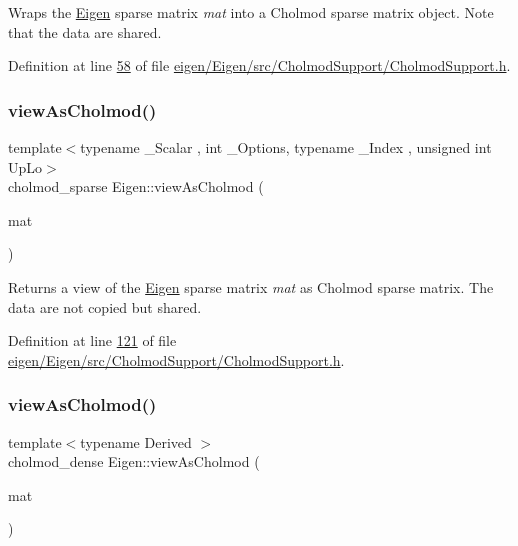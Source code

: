 Wraps the \hyperlink{namespace_eigen}{Eigen} sparse matrix {\itshape mat} into a Cholmod sparse matrix object. Note that the data are shared. 

Definition at line \hyperlink{eigen_2_eigen_2src_2_cholmod_support_2_cholmod_support_8h_source_l00058}{58} of file \hyperlink{eigen_2_eigen_2src_2_cholmod_support_2_cholmod_support_8h_source}{eigen/\+Eigen/src/\+Cholmod\+Support/\+Cholmod\+Support.\+h}.

\mbox{\label{namespace_eigen_afacb818b18280e2e1ab73836ab74cab5}} 
\subsubsection{\texorpdfstring{view\+As\+Cholmod()}{viewAsCholmod()}\hspace{0.1cm}{\footnotesize\ttfamily [2/3]}}
{\footnotesize\ttfamily template$<$typename \+\_\+\+Scalar , int \+\_\+\+Options, typename \+\_\+\+Index , unsigned int Up\+Lo$>$ \\
cholmod\+\_\+sparse Eigen\+::view\+As\+Cholmod (\begin{DoxyParamCaption}\item[{const \hyperlink{group___sparse_core___module_class_eigen_1_1_sparse_self_adjoint_view}{Sparse\+Self\+Adjoint\+View}$<$ const \hyperlink{group___sparse_core___module_class_eigen_1_1_sparse_matrix}{Sparse\+Matrix}$<$ \+\_\+\+Scalar, \+\_\+\+Options, \+\_\+\+Index $>$, Up\+Lo $>$ \&}]{mat }\end{DoxyParamCaption})}

Returns a view of the \hyperlink{namespace_eigen}{Eigen} sparse matrix {\itshape mat} as Cholmod sparse matrix. The data are not copied but shared. 

Definition at line \hyperlink{eigen_2_eigen_2src_2_cholmod_support_2_cholmod_support_8h_source_l00121}{121} of file \hyperlink{eigen_2_eigen_2src_2_cholmod_support_2_cholmod_support_8h_source}{eigen/\+Eigen/src/\+Cholmod\+Support/\+Cholmod\+Support.\+h}.

\mbox{\label{namespace_eigen_a92fe7b595099051fa1d1c443641a6de3}} 
\subsubsection{\texorpdfstring{view\+As\+Cholmod()}{viewAsCholmod()}\hspace{0.1cm}{\footnotesize\ttfamily [3/3]}}
{\footnotesize\ttfamily template$<$typename Derived $>$ \\
cholmod\+\_\+dense Eigen\+::view\+As\+Cholmod (\begin{DoxyParamCaption}\item[{\hyperlink{group___core___module_class_eigen_1_1_matrix_base}{Matrix\+Base}$<$ Derived $>$ \&}]{mat }\end{DoxyParamCaption})}

